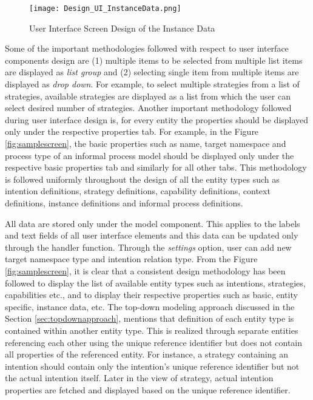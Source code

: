 \begin{figure} [H]
	\centering
	\texttt{[image: Design\_UI\_InstanceData.png]}
	\caption{User Interface Screen Design of the Instance Data}
	\label{fig:samplescreen_instance}
\end{figure}


Some of the important methodologies followed with respect to user interface components design are (1) multiple items to be selected from multiple list items are displayed as \textit{list group} and (2) selecting single item from multiple items are displayed as \textit{drop down}. For example, to select multiple strategies from a list of strategies, available strategies are displayed as a list from which the user can select desired number of strategies. Another important methodology followed during user interface design is, for every entity the properties should be displayed only under the respective properties tab. For example, in the Figure \ref{fig:samplescreen}, the basic properties such as name, target namespace and process type of an informal process model should be displayed only under the respective basic properties tab and similarly for all other tabs. This methodology is followed uniformly throughout the design of all the entity types such as intention definitions, strategy definitions, capability definitions, context definitions, instance definitions and informal process definitions. 

All data are stored only under the model component. This applies to the labels and text fields of all user interface elements and this data can be updated only through the handler function. Through the \textit{settings} option, user can add new target namespace type and intention relation type. From the Figure \ref{fig:samplescreen}, it is clear that a consistent design methodology has been followed to display the list of available entity types such as intentions, strategies, capabilities etc., and to display their respective properties such as basic, entity specific, instance data, etc. The top-down modeling approach discussed in the Section \ref{sec:topdownapproach}, mentions that definition of each entity type is contained within another entity type. This is realized through separate entities referencing each other using the unique reference identifier but does not contain all properties of the referenced entity. For instance, a strategy containing an intention should contain only the intention's unique reference identifier but not the actual intention itself. Later in the view of strategy, actual intention properties are fetched and displayed based on the unique reference identifier. 


